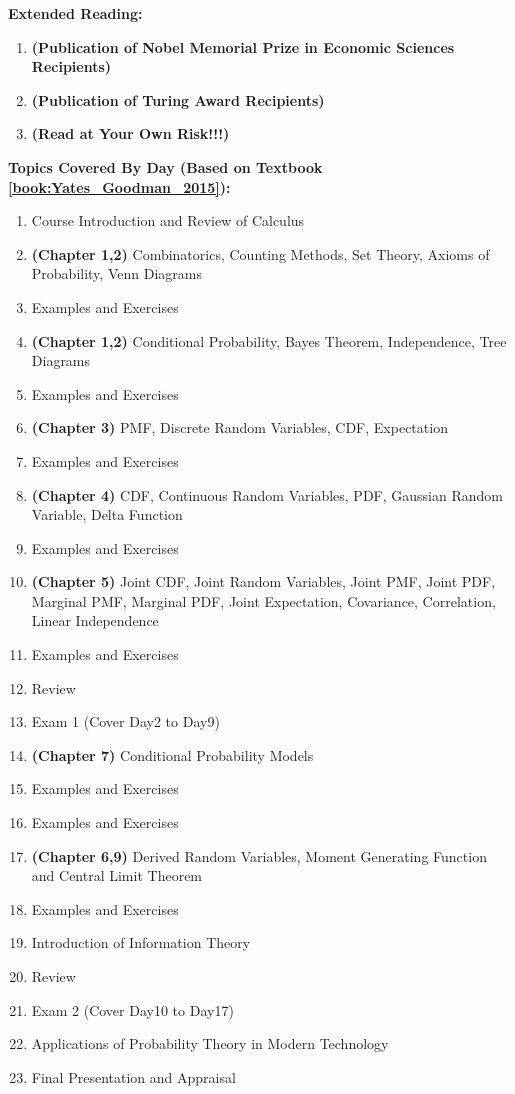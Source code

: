 \documentclass{article}
\theoremstyle{definition}
\theoremstyle{remark}
\begin{document}
\textbf{Extended Reading:}{
    \begin{enumerate}
            \item \textbf{(Publication of Nobel Memorial Prize in Economic Sciences Recipients)} 
            \item \textbf{(Publication of Turing Award Recipients)} 
            \item \textbf{(Read at Your Own Risk!!!)} 
    \end{enumerate}
}

\textbf{Topics Covered By Day (Based on Textbook \cref{book:Yates_Goodman_2015}):} {
    \begin{enumerate}
        \item Course Introduction and Review of Calculus
        \item \textbf{(Chapter 1,2)} Combinatorics, Counting Methods, Set Theory, Axioms of Probability, Venn Diagrams
        \item Examples and Exercises
        \item \textbf{(Chapter 1,2)} Conditional Probability, Bayes Theorem, Independence, Tree Diagrams
        \item Examples and Exercises
        \item \textbf{(Chapter 3)} PMF, Discrete Random Variables, CDF, Expectation
        \item Examples and Exercises
        \item \textbf{(Chapter 4)} CDF, Continuous Random Variables, PDF, Gaussian Random Variable, Delta Function
        \item Examples and Exercises
        \item \textbf{(Chapter 5)} Joint CDF, Joint Random Variables, Joint PMF, Joint PDF, Marginal PMF, Marginal PDF, Joint Expectation, Covariance, Correlation, Linear Independence
        \item Examples and Exercises
        \item Review
        \item Exam 1 (Cover Day2 to Day9)
        \item \textbf{(Chapter 7)} Conditional Probability Models
        \item Examples and Exercises
        \item Examples and Exercises
        \item \textbf{(Chapter 6,9)} Derived Random Variables, Moment Generating Function and Central Limit Theorem
        \item Examples and Exercises
        \item Introduction of Information Theory
        \item Review
        \item Exam 2 (Cover Day10 to Day17)
        \item Applications of Probability Theory in Modern Technology
        \item Final Presentation and Appraisal
    \end{enumerate}
}
\end{document}
